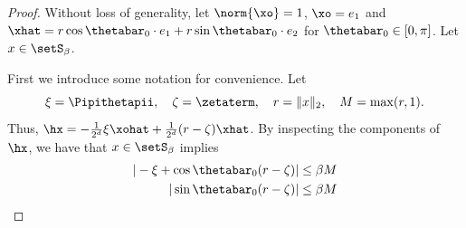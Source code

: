 \begin{proof}
Without loss of generality, let $\norm{\xo}
 =1$, $\xo = e_1$ and $\xhat = r \cos \thetabar_0 \cdot e_1 + r \sin \thetabar_0 \cdot e_2$ for $\thetabar_0 \in [0, \pi]$.  Let $x \in \setS_\beta$. 

First we introduce some notation for convenience.  Let
\[
\xi = \Pipithetapii, \quad \zeta = \zetaterm, \quad r = \|x\|_2, \quad M = \max(r, 1).
\]
Thus, $\hx = - \frac{1}{2^d}\xi  \xohat + \frac{1}{2^d} (r- \zeta) \xhat$. 
By inspecting the components of $\hx$, we have that $x\in \setS_\beta$ implies
\begin{align}
|-\xi + \cos \thetabar_0 ( r - \zeta)| \leq \beta M \label{Seps-e1term}\\
|\sin \thetabar_0 (r - \zeta)| \leq \beta M \label{Seps-e2term}
\end{align}


\end{proof}
